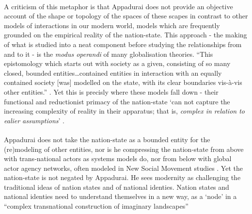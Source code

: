 \documentclass{article}
\begin{document}
\begin{doublespacing}
\paragraph{}A criticism of this metaphor is that Appadurai does not provide an objective account of the shape or topology of the spaces of these scapes in contrast to other models of interactions in our modern world, models which are frequently grounded on the empirical reality of the nation-state. This approach - the making of what is studied into a neat component before studying the relationships from and to it - is the \emph{modus operandi} of many globalisation theories. ``This epistomology which starts out with society as a given, consisting of so many closed, bounded entities\ldots contained entities in interaction with an equally contained society [was] modelled on the state, with its clear boundaries vis-\`{a}-vis other entities.'' \cite[p.126]{Nustad:2003}. Yet this is precisly where these models fall down - their functional and reductionist primacy of the nation-state `can not capture the increasing complexity of reality in their apparatus; that is, \emph{complex in relation to ealier assumptions}' \cite[p. 126, emphasis added]{Nustad:2003}.

\paragraph{}Appadurai does not take the nation-state as a bounded entity for the (re)modeling of other entities, nor is he compressing the nation-state from above with trans-national actors as systems models do, nor from below with global actor agency networks, often modeled in New Social Movement studies . Yet the nation-state is not negated by Appadurai. He sees modernity as challenging the traditional ideas of nation states and of national identies. Nation states and national identies need to understand themselves in a new way, as a `node' in a ``complex transnational construction of imaginary landscapes''  \cite[p.31]{Appadurai:1996lp}


\end{doublespacing}
\end{document}
